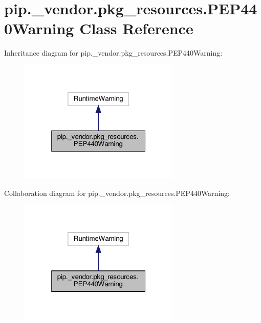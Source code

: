 \hypertarget{classpip_1_1__vendor_1_1pkg__resources_1_1PEP440Warning}{}\section{pip.\+\_\+vendor.\+pkg\+\_\+resources.\+P\+E\+P440\+Warning Class Reference}
\label{classpip_1_1__vendor_1_1pkg__resources_1_1PEP440Warning}


Inheritance diagram for pip.\+\_\+vendor.\+pkg\+\_\+resources.\+P\+E\+P440\+Warning\+:
\nopagebreak
\begin{figure}[H]
\begin{center}
\leavevmode
\includegraphics[width=217pt]{classpip_1_1__vendor_1_1pkg__resources_1_1PEP440Warning__inherit__graph}
\end{center}
\end{figure}


Collaboration diagram for pip.\+\_\+vendor.\+pkg\+\_\+resources.\+P\+E\+P440\+Warning\+:
\nopagebreak
\begin{figure}[H]
\begin{center}
\leavevmode
\includegraphics[width=217pt]{classpip_1_1__vendor_1_1pkg__resources_1_1PEP440Warning__coll__graph}
\end{center}
\end{figure}


